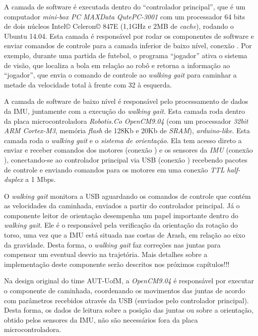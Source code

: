 A camada de software é executada dentro do ``controlador principal'', que é um computador \textit{mini-box PC MAXData QutePC-3001} com um processador 64 bits de dois núcleos Intel\copyright{} Celeron\copyright{} 847E (1,1GHz e 2MB de \textit{cache}), rodando o Ubuntu 14.04. Esta camada é responsável por rodar os componentes de software e enviar comandos de controle para a camada inferior de baixo nível, conexão . Por exemplo, durante uma partida de futebol, o programa ``jogador'' ativa o sistema de visão, que localiza a bola em relação ao robô e retorna a informação ao ``jogador'', que envia o comando de controle ao \textit{walking gait} para caminhar a metade da velocidade total à frente com 32\degree{} à esquerda.

A camada de software de baixo nível é responsável pelo processamento de dados da IMU, juntamente com a execução do \textit{walking gait}. Esta camada roda dentro da placa microcontroladora \textit{Robotis.Co OpenCM9.04} (com um processador \textit{32bit ARM Cortex-M3}, memória \textit{flash} de 128Kb e 20Kb de \textit{SRAM}), \textit{arduino-like}. Esta camada roda o \textit{walking gait} e o \textit{sistema de orientação}. Ela tem acesso direto a enviar e receber comandos dos motores (conexão ) e os sensores da \textit{IMU} (conexão ), conectando-se ao controlador principal via USB (conexão ) recebendo pacotes de controle e enviando comandos para os motores em uma conexão \textit{TTL} \textit{half-duplex} a 1 Mbps.

O \textit{walking gait} monitora a USB aguardando os comandos de controle que contém as velocidades da caminhada, enviados a partir do controlador principal. Já o componente leitor de orientação desempenha um papel importante dentro do \textit{walking gait}. Ele é o responsável pela verificação da orientação da rotação do torso, uma vez que a IMU está situada nas costas de Arash, em relação ao eixo da gravidade. Desta forma, o \textit{walking gait} faz correções nas juntas para compensar um eventual desvio na trajetória. Mais detalhes sobre a implementação deste componente serão descritos nos próximos capítulos!!!

Na design original do time AUT-UofM, a \textit{OpenCM9.04} é responsável por executar o componente de caminhada, coordenando os movimentos das juntas de acordo com parâmetros recebidos através da USB (enviados pelo controlador principal). Desta forma, os dados de leitura sobre a posição das juntas ou sobre a orientação, obtido pelos sensores da IMU, não são necessários fora da placa microcontroladora.

